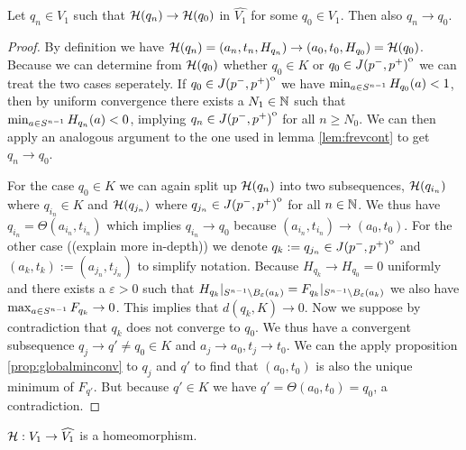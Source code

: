 \begin{lemma}
    Let $q_n \in V_1$ such that ${\mathcal{H}}(q_n)\to {\mathcal{H}}(q_0)$ in $\widehat{V_1}$ for some $q_0\in V_1$. Then also $q_n \to q_0$.
\end{lemma}
\begin{proof}
    By definition we have ${\mathcal{H}}(q_n) = (a_n,t_n,H_{q_n}) \to (a_0,t_0,H_{q_0}) = {\mathcal{H}}(q_0)$. Because we can determine from ${\mathcal{H}}(q_0)$ whether $q_0\in K$ or $q_0\in {\kern0ptJ(p^-,p^+)}^{\mathrm{o}}$ we can treat the two cases seperately. 
    If $q_0\in {\kern0ptJ(p^-,p^+)}^{\mathrm{o}}$ we have $\min_{a\in {S^{n-1}}} H_{q_0}(a) < 1$, then by uniform convergence there exists a $N_1\in \mathbb{N}$ such that $\min_{a\in {S^{n-1}}} H_{q_n}(a)<0$, implying $q_n\in {\kern0ptJ(p^-,p^+)}^{\mathrm{o}}$ for all $n \ge N_0$. We can then apply an analogous argument to the one used in lemma \ref{lem:frevcont} to get $q_n \to q_0$.

    For the case $q_0\in K$ we can again split up ${\mathcal{H}}(q_n)$ into two subsequences, ${\mathcal{H}}(q_{i_n})$ where $q_{i_n}\in K$ and ${\mathcal{H}}(q_{j_n})$ where $q_{j_n}\in {\kern0ptJ(p^-,p^+)}^{\mathrm{o}}$ for all $n\in \mathbb{N}$. We thus have $q_{i_n}=\Theta(a_{i_n},t_{i_n})$ which implies $q_{i_n}\to q_0$ because $(a_{i_n},t_{i_n}) \to (a_0,t_0)$. For the other case ((explain more in-depth)) we denote $q_k:=q_{j_n}\in {\kern0ptJ(p^-,p^+)}^{\mathrm{o}}$ and $(a_k,t_k):=(a_{j_n},t_{j_n})$ to simplify notation. Because $H_{q_k}\to H_{q_0}=0$ uniformly and there exists a $\varepsilon>0$ such that $H_{q_k}\rvert_{{S^{n-1}}\setminus B_\varepsilon(a_k)} = F_{q_k}\rvert_{{S^{n-1}}\setminus B_\varepsilon(a_k)}$ we also have $\max_{a\in {S^{n-1}}} F_{q_k}\to 0$. This implies that $d(q_k, K)\to 0$. Now we suppose by contradiction that $q_k$ does not converge to $q_0$. We thus have a convergent subsequence $q_j\to q'\neq q_0\in K$ and $a_j\to a_0, t_j\to t_0$. We can the apply proposition \ref{prop:globalminconv} to $q_j$ and $q'$ to find that $(a_0,t_0)$ is also the unique minimum of $F_{q'}$. But because $q'\in K$ we have $q' = \Theta(a_0,t_0) = q_0$, a contradiction.
\end{proof}

\begin{corollary}\label{cor:Hhomeo}
    ${\mathcal{H}}:V_1 \to \widehat{V_1}$ is a homeomorphism.
\end{corollary}

